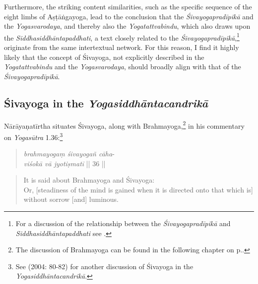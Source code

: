 Furthermore, the striking content similarities, such as the specific sequence of the eight limbs of Aṣṭāṅgayoga, lead to the conclusion that the \textit{Śivayogapradīpikā} and the \textit{Yogasvarodaya}, and thereby also the \textit{Yogatattvabindu}, which also draws upon the \textit{Siddhasiddhāntapaddhati}, a text closely related to the \textit{Śivayogapradīpikā},\footnote{For a discussion of the relationship between the \textit{Śivayogapradīpikā} and \textit{Siddhasiddhāntapaddhati} see \citeauthor[2023: 147-52]{powell2023}.} originate from the same intertextual network. For this reason, I find it highly likely that the concept of Śivayoga, not explicitly described in the \textit{Yogatattvabindu} and the \textit{Yogasvarodaya}, should broadly align with that of the \textit{Śivayogapradīpikā}.
  
\subsection{Śivayoga in the \textit{Yogasiddhāntacandrikā}}
\label{sivayogacandri}
Nārāyaṇatīrtha situates Śivayoga, along with Brahmayoga,\footnote{The discussion of Brahmayoga can be found in the following chapter on p.\pageref{brahmayogaintro}.} in his commentary on \textit{Yogasūtra} 1.36:\footnote{See \citeauthor{penna2004} (2004: 80-82) for another discussion of Śivayoga in the \textit{Yogasiddhāntacandrikā}.}

\begin{quote}
\textit{brahmayogaṃ śivayogañ cāha}-\\
\textit{viśokā vā jyotiṣmatī} || 36 ||
\end{quote}
\begin{quote}
It is said about Brahmayoga and Śivayoga: \\
Or, [steadiness of the mind is gained when it is directed onto that which is] without sorrow [and] luminous.  
\end{quote}

